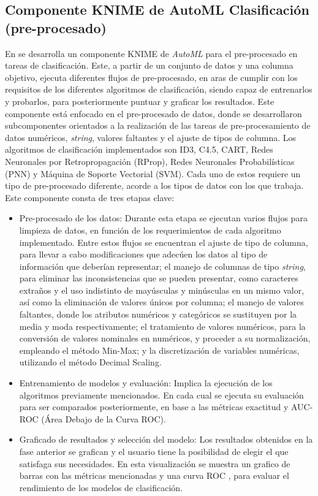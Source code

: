 \subsection{Componente KNIME de AutoML Clasificación (pre-procesado)}\label{sec:componente-knime-de-automl-clasificacion-pre-procesado}
En \citep{Carrazana2022} se desarrolla un componente KNIME de \textit{AutoML} para el pre-procesado en tareas de clasificación. Este, a partir de un conjunto de datos y una columna objetivo, ejecuta diferentes flujos de pre-procesado, en aras de cumplir con los requisitos de los diferentes algoritmos de clasificación, siendo capaz de entrenarlos y probarlos, para posteriormente puntuar y graficar los resultados. Este componente está enfocado en el pre-procesado de datos, donde se desarrollaron subcomponentes orientados a la realización de las tareas de pre-procesamiento de datos numéricos, \textit{string}, valores faltantes y el ajuste de tipos de columna. Los algoritmos de clasificación implementados son ID3, C4.5, CART, Redes Neuronales por Retropropagación (RProp), Redes Neuronales Probabilísticas (PNN) y Máquina de Soporte Vectorial (SVM). Cada uno de estos requiere un tipo de pre-procesado diferente, acorde a los tipos de datos con los que trabaja. Este componente consta de tres etapas clave:

\begin{itemize}
	\item Pre-procesado de los datos: Durante esta etapa se ejecutan varios flujos para limpieza de datos, en función de los requerimientos de cada algoritmo implementado. Entre estos flujos se encuentran el ajuste de tipo de columna, para llevar a cabo modificaciones que adecúen los datos al tipo de información que deberían representar; el manejo de columnas de tipo \textit{string}, para eliminar las inconsistencias que se pueden presentar, como caracteres extraños y el uso indistinto de mayúsculas y minúsculas en un mismo valor, así como la eliminación de valores únicos por columna; el manejo de valores faltantes, donde los atributos numéricos y categóricos se sustituyen por la media y moda respectivamente; el tratamiento de valores numéricos, para la conversión de valores nominales en numéricos, y proceder a su normalización, empleando el método Min-Max; y la discretización de variables numéricas, utilizando el método Decimal Scaling.
	\item Entrenamiento de modelos y evaluación: Implica la ejecución de los algoritmos previamente mencionados. En cada cual se ejecuta su evaluación para ser comparados posteriormente, en base a las métricas exactitud y AUC-ROC (Área Debajo de la Curva ROC).
	\item Graficado de resultados y selección del modelo: Los resultados obtenidos en la fase anterior se grafican y  el usuario tiene la posibilidad de elegir el que satisfaga sus necesidades. En esta visualización se muestra un grafico de barras con las métricas mencionadas y una curva ROC , para evaluar el rendimiento de los modelos de clasificación. 
\end{itemize}

